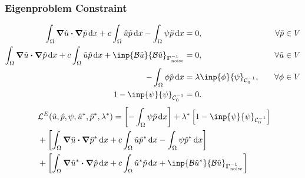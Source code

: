 \documentclass[
  pdf,
  10pt,
  xcolor={svgnames},
]{beamer}
\newcommand{\mc}[1]{\mathcal{#1}}
\newcommand{\mat}[1]{\mathbf{{#1}}}
\newcommand{\Gnoise}{\mat{\Gamma}_{\rm noise}}
\begin{document}
\begin{frame}
  \frametitle{Eigenproblem Constraint}
  \begin{align*}
    \int_\Omega \grad \hat{u} \vdot \grad \tilde{p} \dd{x}
    + c\int_\Omega \hat{u} \tilde{p} \dd{x}
    - \int_\Omega \psi \tilde{p} \dd{x}
     & = 0,
     & \quad \forall \tilde{p} \in V \\
    \int_\Omega \grad \tilde{u} \vdot \grad \hat{p} \dd{x}
    + c \int_\Omega \tilde{u} \hat{p} \dd{x}
    + \inp{\mc{B} \tilde{u}}{\mc{B}\hat{u}}_{\Gnoise^{-1}}
     & = 0,
     & \quad \forall \tilde{u} \in V \\
    -\int_\Omega \phi \hat{p} \dd{x}
     & =
    \lambda \inp{\phi}{\psi}_{\mc{C}_0^{-1}},
     & \quad \forall \phi \in V      \\
    1 - \inp{\psi}{\psi}_{\mc{C}_0^{-1}}
     & = 0.
     &
  \end{align*}
  \pause
  \begin{align*}
     & ~ \mc{L}^E(\hat{u},\hat{p},\psi,\hat{u}^*,\hat{p}^*,\lambda^*)
    = \left[
      -\int_\Omega \psi \hat{p} \dd{x}
      \right]
    + \lambda^* \left[
    1 - \inp{\psi}{\psi}_{\mc{C}_0^{-1}}
    \right]                                                           \\
     & ~
    + \left[
      \int_\Omega \grad \hat{u} \vdot \grad \hat{p}^* \dd{x}
      + c\int_\Omega \hat{u} \hat{p}^* \dd{x}
      - \int_\Omega \psi \hat{p}^* \dd{x}
    \right]                                                           \\
     & ~
    + \left[
      \int_\Omega \grad \hat{u}^* \vdot \grad \hat{p} \dd{x}
      + c \int_\Omega \hat{u}^* \hat{p} \dd{x}
      + \inp{\mc{B} \hat{u}^*}{\mc{B}\hat{u}}_{\Gnoise^{-1}}
      \right]
  \end{align*}

\end{frame}
\end{document}
